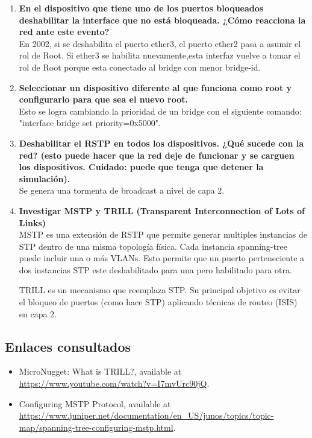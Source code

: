 \documentclass[letterpaper,12pt]{article}
\begin{document}
\begin{enumerate}
	\item \textbf{En el dispositivo que tiene uno de los puertos bloqueados deshabilitar la interface que no está bloqueada. ¿Cómo reacciona la red ante este evento?} \\
	En 2002, si se deshabilita el puerto ether3, el puerto ether2 pasa a asumir el rol de Root. Si ether3 se habilita nuevamente,esta interfaz vuelve a tomar el rol de Root porque esta conectado al bridge con menor bridge-id.

	\item \textbf{Seleccionar un dispositivo diferente al que funciona como root y configurarlo para que sea el nuevo root.} \\
	Esto se logra cambiando la prioridad de un bridge con el siguiente comando: "interface bridge set priority=0x5000".

	\item \textbf{Deshabilitar  el  RSTP  en  todos  los  dispositivos. ¿Qué  sucede  con  la red? (esto puede hacer que la red deje de funcionar y se carguen los dispositivos. Cuidado: puede que tenga que detener la simulación).} \\
	Se genera una tormenta de broadcast a nivel de capa 2.
	
	\item \textbf{Investigar  MSTP  y  TRILL  (Transparent  Interconnection  of  Lots  of Links)} \\
	MSTP es una extensión de RSTP que permite generar multiples instancias de STP dentro de una misma topología física. Cada instancia spanning-tree puede incluir una o más VLANs. Esto permite que un puerto perteneciente a dos instancias STP este deshabilitado para una pero habilitado para otra.
	
	TRILL es un mecanismo que reemplaza STP. Su principal objetivo es evitar el bloqueo de puertos (como hace STP) aplicando técnicas de routeo (ISIS) en capa 2.  
\end{enumerate}
\subsection{Enlaces consultados}
\begin{itemize}
    \item{MicroNugget: What is TRILL?},  available at \url{https://www.youtube.com/watch?v=I7mvUrc90jQ}.
    \item{Configuring MSTP Protocol},  available at \url{https://www.juniper.net/documentation/en_US/junos/topics/topic-map/spanning-tree-configuring-mstp.html}.
\end{itemize}
\end{document}

